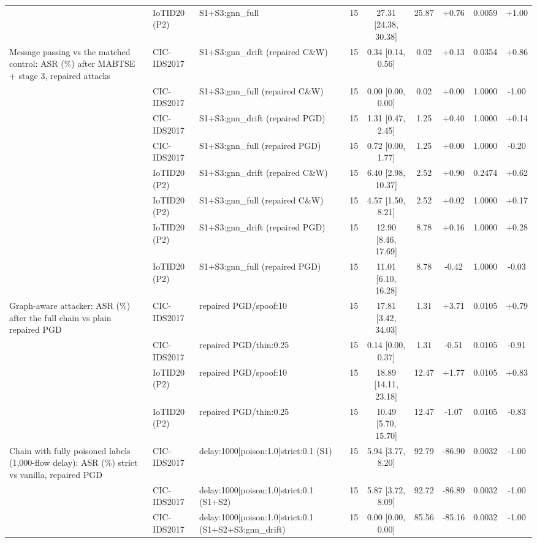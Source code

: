 \begin{table}[t]
\begin{tabular}{lllcccccc}
 & IoTID20 (P2) & S1+S3:gnn\_full & 15 & 27.31 [24.38, 30.38] & 25.87 & +0.76 & 0.0059 & +1.00 \\
Message passing vs the matched control: ASR (\%) after MABTSE + stage 3, repaired attacks & CIC-IDS2017 & S1+S3:gnn\_drift (repaired C\&W) & 15 & 0.34 [0.14, 0.56] & 0.02 & +0.13 & 0.0354 & +0.86 \\
 & CIC-IDS2017 & S1+S3:gnn\_full (repaired C\&W) & 15 & 0.00 [0.00, 0.00] & 0.02 & +0.00 & 1.0000 & -1.00 \\
 & CIC-IDS2017 & S1+S3:gnn\_drift (repaired PGD) & 15 & 1.31 [0.47, 2.45] & 1.25 & +0.40 & 1.0000 & +0.14 \\
 & CIC-IDS2017 & S1+S3:gnn\_full (repaired PGD) & 15 & 0.72 [0.00, 1.77] & 1.25 & +0.00 & 1.0000 & -0.20 \\
 & IoTID20 (P2) & S1+S3:gnn\_drift (repaired C\&W) & 15 & 6.40 [2.98, 10.37] & 2.52 & +0.90 & 0.2474 & +0.62 \\
 & IoTID20 (P2) & S1+S3:gnn\_full (repaired C\&W) & 15 & 4.57 [1.50, 8.21] & 2.52 & +0.02 & 1.0000 & +0.17 \\
 & IoTID20 (P2) & S1+S3:gnn\_drift (repaired PGD) & 15 & 12.90 [8.46, 17.69] & 8.78 & +0.16 & 1.0000 & +0.28 \\
 & IoTID20 (P2) & S1+S3:gnn\_full (repaired PGD) & 15 & 11.01 [6.10, 16.28] & 8.78 & -0.42 & 1.0000 & -0.03 \\
Graph-aware attacker: ASR (\%) after the full chain vs plain repaired PGD & CIC-IDS2017 & repaired PGD/spoof:10 & 15 & 17.81 [3.42, 34.03] & 1.31 & +3.71 & 0.0105 & +0.79 \\
 & CIC-IDS2017 & repaired PGD/thin:0.25 & 15 & 0.14 [0.00, 0.37] & 1.31 & -0.51 & 0.0105 & -0.91 \\
 & IoTID20 (P2) & repaired PGD/spoof:10 & 15 & 18.89 [14.11, 23.18] & 12.47 & +1.77 & 0.0105 & +0.83 \\
 & IoTID20 (P2) & repaired PGD/thin:0.25 & 15 & 10.49 [5.70, 15.70] & 12.47 & -1.07 & 0.0105 & -0.83 \\
Chain with fully poisoned labels (1,000-flow delay): ASR (\%) strict vs vanilla, repaired PGD & CIC-IDS2017 & delay:1000|poison:1.0|strict:0.1 (S1) & 15 & 5.94 [3.77, 8.20] & 92.79 & -86.90 & 0.0032 & -1.00 \\
 & CIC-IDS2017 & delay:1000|poison:1.0|strict:0.1 (S1+S2) & 15 & 5.87 [3.72, 8.09] & 92.72 & -86.89 & 0.0032 & -1.00 \\
 & CIC-IDS2017 & delay:1000|poison:1.0|strict:0.1 (S1+S2+S3:gnn\_drift) & 15 & 0.00 [0.00, 0.00] & 85.56 & -85.16 & 0.0032 & -1.00 \\

\end{tabular}
\end{table}
